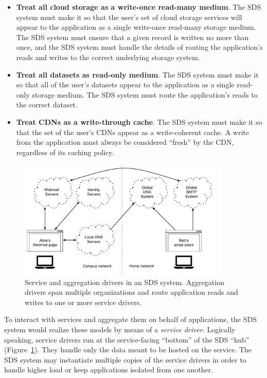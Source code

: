 \begin{itemize}
   \item \textbf{Treat all cloud storage as a write-once read-many medium}.  The SDS
      system must make it so that the user's set of cloud storage
      services will appear to the application as a single write-once read-many
      storage medium.  The SDS system must ensure that a given record is written
      no more than once, and the SDS system must handle the details of routing
      the application's reads and writes to the correct underlying storage system.
   \item \textbf{Treat all datasets as read-only medium}.  The SDS system must
      make it so that all of the user's datasets appear to the application as a
      single read-only storage medium.  The SDS system must route the
      application's reads to the correct dataset.
   \item \textbf{Treat CDNs as a write-through cache}.  The SDS system must make
      it so that the set of the user's CDNs appear as a write-coherent
      cache.  A write from the application must always be considered ``fresh''
      by the CDN, regardless of its caching policy.
\end{itemize}


\begin{figure}[h]
   \centering
   \includegraphics[width=0.9\textwidth,page=3]{figures/dissertation-figures}
   \caption{Service and aggregation drivers in an SDS system.  Aggregation
   drivers span multiple organizations and route application reads and writes to
   one or more service drivers.}
   \label{fig:chap2-driver-overview}
\end{figure}

To interact with services and aggregate them on behalf of applications, the SDS
system would realize these models by means of a \emph{service driver}.
Logically speaking, service drivers run at the service-facing ``bottom'' of the
SDS ``hub'' (Figure~\ref{fig:chap2-driver-overview}).
They handle only the data meant to be hosted on the service.  The SDS system may
instantiate multiple copies of the service drivers in order to handle higher
load or keep applications isolated from one another.

